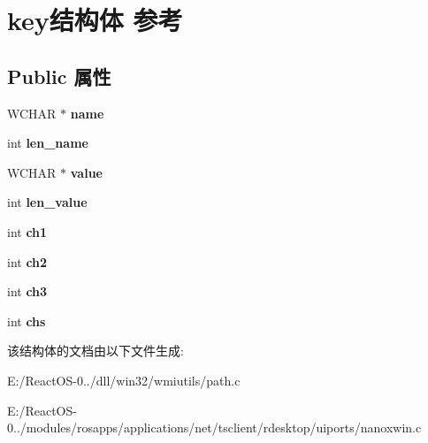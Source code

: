 \hypertarget{structkey}{}\section{key结构体 参考}
\label{structkey}
\subsection*{Public 属性}
\begin{DoxyCompactItemize}
\item 
\mbox{\label{structkey_ae71ed90207f7647a74f2cfe62f4b1bbb}} 
W\+C\+H\+AR $\ast$ {\bfseries name}
\item 
\mbox{\label{structkey_ae321d77684ddc5a234f1d31f287ed8a2}} 
int {\bfseries len\+\_\+name}
\item 
\mbox{\label{structkey_a449fc92551fd0277de24af6ddc4a7a38}} 
W\+C\+H\+AR $\ast$ {\bfseries value}
\item 
\mbox{\label{structkey_a35d7d8e0d2ebaf2ed2c2b8134cfc742f}} 
int {\bfseries len\+\_\+value}
\item 
\mbox{\label{structkey_ac93949eccfb440e3d25823a1ecb4fa39}} 
int {\bfseries ch1}
\item 
\mbox{\label{structkey_a2b4d0d0787a161119165d7383a988eb7}} 
int {\bfseries ch2}
\item 
\mbox{\label{structkey_ad7aec875050b439ada62ed3fa029f3e6}} 
int {\bfseries ch3}
\item 
\mbox{\label{structkey_a37e444d69cf0370dea737bba2e46008b}} 
int {\bfseries chs}
\end{DoxyCompactItemize}


该结构体的文档由以下文件生成\+:\begin{DoxyCompactItemize}
\item 
E\+:/\+React\+O\+S-\/0../dll/win32/wmiutils/path.\+c\item 
E\+:/\+React\+O\+S-\/0../modules/rosapps/applications/net/tsclient/rdesktop/uiports/nanoxwin.\+c\end{DoxyCompactItemize}

